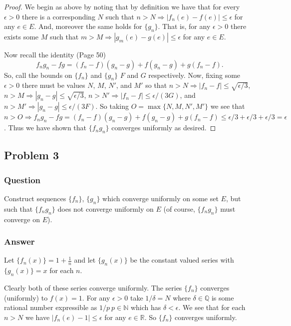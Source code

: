 \documentclass[12pt]{article}
\begin{document}
\begin{proof} We begin as above by noting that by definition we have that for every $\epsilon > 0 $ there is a corresponding $N$ such that $n>N \Rightarrow | f_n(e) - f(e) | \leq \epsilon$ for any $e \in E$. And, moreover the same holds for $\{g_n\}$. That is, for any $\epsilon >0$ there exists some $M$ such that $m>M \Rightarrow |g_m(e) - g(e)| \leq \epsilon $ for any $e \in E$. 

Now recall the identity (Page 50)
\[f_n g_n - f g = (f_n - f)(g_n - g)+f(g_n - g)+ g (f_n - f).\]
So, call the bounds on $\{f_n\}$ and $\{g_n\}$ $F$ and $G$ respectively. Now, fixing some $\epsilon>0$ there must be values $N$, $M$, $N'$, and $M'$ so that $n>N \Rightarrow |f_n-f| \leq \sqrt{\epsilon/3}$, $n>M \Rightarrow |g_n-g| \leq \sqrt{\epsilon/3}$, $n>N' \Rightarrow |f_n-f| \leq  \epsilon /(3G)$, and $n>M' \Rightarrow |g_n-g| \leq  \epsilon /(3F)$. So taking  $O = \max{\{N,M,N',M'\}}$ we see that $n>O \Rightarrow f_ng_n- f g =  (f_n - f)(g_n - g)+f(g_n - g)+ g (f_n - f) \leq \epsilon / 3 + \epsilon / 3 + \epsilon / 3 = \epsilon$.  Thus we have shown that $\{f_n g_n \}$ converges uniformly as desired.\end{proof}


\subsection{Problem 3}

\subsubsection{Question}
Construct sequences $\{f_n\}$, $\{g_n\}$ which converge uniformly on some set $E$, but such that $\{f_n g_n\}$ does not converge uniformly on $E$ (of course, $\{f_n g_n\}$ must converge on $E$).
\subsubsection{Answer}
Let $\{f_n(x)\}= 1+ \frac{1}{n}$ and let $\{g_n(x)\}$ be the constant valued series with $\{g_n(x)\}=x$ for each $n$.

Clearly both of these series converge uniformly. The series $\{f_n\}$ converges (uniformly) to $f(x)=1$. For any $\epsilon > 0$ take $1/\delta = N$ where $\delta \in \mathbb{Q}$ is some rational number expressible as $1/p \ p \in \mathbb{N}$ which has $ \delta <\epsilon$.  We see that for each $n>N$ we have $|f_n(e) - 1| \leq \epsilon$ for any $e \in \mathbb{R}$. So  $\{f_n\}$ converges uniformly.
\end{document}
